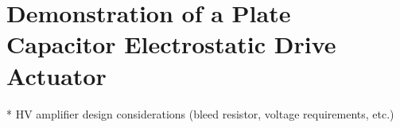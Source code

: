 \chapter{Demonstration of a Plate Capacitor Electrostatic Drive Actuator}
\label{c:esd-concept}

* HV amplifier design considerations (bleed resistor, voltage requirements, etc.)
